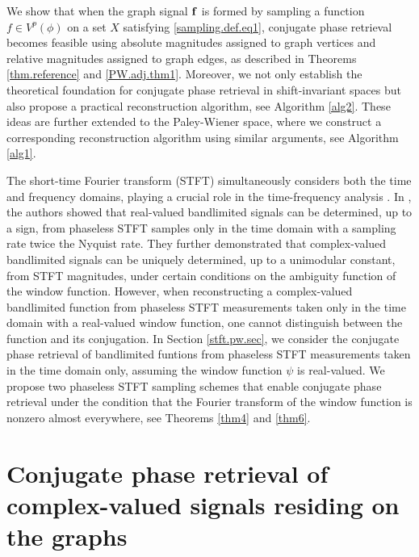 \documentclass[12pt,oneside,reqno]{amsart}
\numberwithin{equation}{section}
\begin{document}
   We show that when  the graph signal $\bf f$
 is formed by sampling a function  $f\in V^p(\phi)$ 
 on a set $X$ satisfying \eqref{sampling.def.eq1}, conjugate phase retrieval becomes feasible using absolute magnitudes assigned to graph vertices and relative magnitudes assigned to graph edges, as described in Theorems \ref{thm.reference} and \ref{PW.adj.thm1}. 
 Moreover, we not only establish the theoretical foundation for conjugate phase retrieval in shift-invariant spaces but also propose a practical reconstruction algorithm, see Algorithm \ref{alg2}. These ideas are further extended to the Paley-Wiener space, where we construct a corresponding reconstruction algorithm using similar arguments, see Algorithm \ref{alg1}.
 

	
	
	
	The short-time Fourier transform (STFT) simultaneously considers both the time and frequency domains, playing a crucial role in the time-frequency analysis \cite{alaifari2021uniqueness,grochenig2001foundations}. In \cite{alaifari2021uniqueness}, the authors showed that real-valued bandlimited signals can be determined, up to a sign, from phaseless STFT samples only in the time domain with a sampling rate twice the Nyquist rate. They further demonstrated that complex-valued bandlimited  signals can be uniquely determined, up to a unimodular constant, from STFT magnitudes,  under certain conditions on the  ambiguity function of the window function.  
	However, when reconstructing a complex-valued bandlimited function from phaseless STFT measurements taken only in the time domain with a real-valued window function, one cannot distinguish between the function  and its conjugation.  
In Section \ref{stft.pw.sec}, we consider the  conjugate phase retrieval of  bandlimited funtions from phaseless STFT measurements taken in the time domain only, assuming the window function $\psi$ is real-valued. We propose two phaseless STFT sampling schemes that enable conjugate phase retrieval under the condition that the Fourier transform of the window function  is nonzero almost everywhere, see Theorems \ref{thm4} and \ref{thm6}. 	
	
	
	\section{Conjugate phase retrieval of complex-valued signals residing on the graphs}\label{cpr.graph.sec}
	
\end{document}
